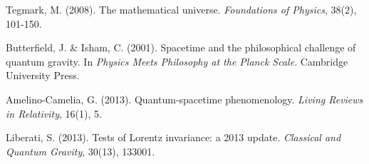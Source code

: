 \documentclass[12pt,a4paper]{article}
\begin{document}
\begin{thebibliography}{99}
Tegmark, M. (2008).
The mathematical universe.
\textit{Foundations of Physics}, 38(2), 101-150.

Butterfield, J. \& Isham, C. (2001).
Spacetime and the philosophical challenge of quantum gravity.
In \textit{Physics Meets Philosophy at the Planck Scale}.
Cambridge University Press.

Amelino-Camelia, G. (2013).
Quantum-spacetime phenomenology.
\textit{Living Reviews in Relativity}, 16(1), 5.

Liberati, S. (2013).
Tests of Lorentz invariance: a 2013 update.
\textit{Classical and Quantum Gravity}, 30(13), 133001.

\end{thebibliography}
\end{document}
